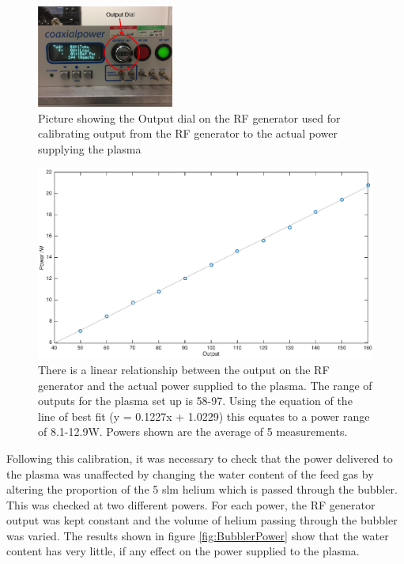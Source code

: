 \documentclass[11pt, oneside]{article}   	%
\begin{document}
\begin{figure}
    \centering
    \includegraphics[width=0.4\textwidth]{Figures/OutputDial.png}
    \caption{Picture showing the Output dial on the RF generator used for calibrating output from the RF generator to the actual power supplying the plasma}
    \label{fig:OutputDial}
\end{figure}

\begin{figure}
    \centering
    \includegraphics[width=\textwidth]{Figures/SolaylPower.eps}
    \caption{There is a linear relationship between the output on the RF generator and the actual power supplied to the plasma. The range of outputs for the plasma set up is 58-97. Using the equation of the line of best fit (y = 0.1227x + 1.0229) this equates to a power range of 8.1-12.9W. Powers shown are the average of 5 measurements.}
    \label{fig:SolaylPower}
\end{figure}

Following this calibration, it was necessary to check that the power delivered to the plasma was unaffected by changing the water content of the feed gas by altering the proportion of the 5 slm helium which is passed through the bubbler.
This was checked at two different powers. 
For each power, the RF generator output was kept constant and the volume of helium passing through the bubbler was varied.
The results shown in figure \ref{fig:BubblerPower} show that the water content has very little, if any effect on the power supplied to the plasma.
\end{document}
